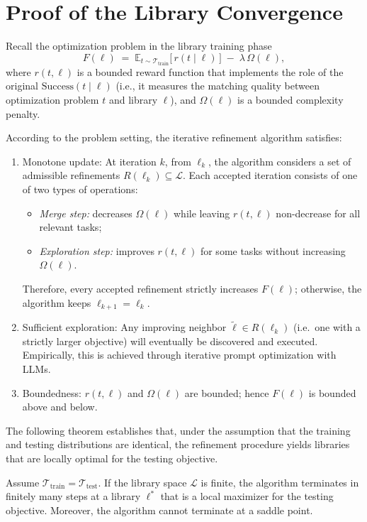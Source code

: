 \documentclass[sigconf, nonacm]{acmart}
\begin{document}
\section{Proof of the Library Convergence\label{sec:appendix:proof}}
Recall the optimization problem in the library training phase
\[
F(\ell) \;=\; \mathbb{E}_{t \sim \mathcal{T}_{\mathrm{train}}}\!\big[\, r(t \mid \ell)\,\big] \;-\; \lambda \, \Omega(\ell),
\]
where \(r(t,\ell)\) is a bounded reward function that implements the role of the original \(\mathrm{Success}(t\mid\ell)\) (i.e., it measures the matching quality between optimization problem \(t\) and library \(\ell\)), and \(\Omega(\ell)\) is a bounded complexity penalty.  

According to the problem setting, the iterative refinement algorithm satisfies:
\begin{enumerate}
    \item Monotone update: At iteration $k$, from $\ell_k$, the algorithm considers a set of admissible refinements $R(\ell_k) \subseteq \mathcal{L}$. Each accepted iteration consists of one of two types of operations:
    \begin{itemize}
      \item \emph{Merge step:} decreases $\Omega(\ell)$ while leaving $r(t,\ell)$ non-decrease for all relevant tasks;
      \item \emph{Exploration step:} improves $r(t,\ell)$ for some tasks without increasing $\Omega(\ell)$.
    \end{itemize}
    Therefore, every accepted refinement strictly increases $F(\ell)$; otherwise, the algorithm keeps $\ell_{k+1} = \ell_k$.
    \item Sufficient exploration: Any improving neighbor $\tilde{\ell} \in R(\ell_k)$ (i.e.\ one with a strictly larger objective) will eventually be discovered and executed. Empirically, this is achieved through iterative prompt optimization with LLMs.
    \item Boundedness: $r(t,\ell)$ and $\Omega(\ell)$ are bounded; hence $F(\ell)$ is bounded above and below. 
\end{enumerate}
The following theorem establishes that, under the assumption that the training and testing distributions are identical, the refinement procedure yields libraries that are locally optimal for the testing objective.
\begin{theorem}
Assume $\mathcal{T}_{\mathrm{train}} = \mathcal{T}_{\mathrm{test}}$. 
If the library space $\mathcal{L}$ is finite, the algorithm terminates in finitely many steps at a library $\ell^*$ that is a local maximizer for the testing objective. 
Moreover, the algorithm cannot terminate at a saddle point.
\label{thm:finite}
\end{theorem}
\end{document}
